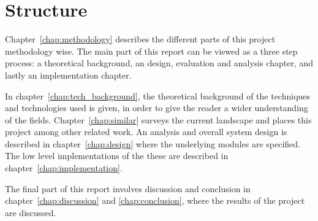 \section{Structure}
  \label{sec:structure}

Chapter~\ref{chap:methodology} describes the different parts of this project methodology wise. The main part of this report can be viewed as a three step process: a theoretical background, an design, evaluation and analysis chapter, and lastly an implementation chapter.

In chapter~\ref{chap:tech_background}, the theoretical background of the techniques and technologies used is given, in order to give the reader a wider understanding of the fields. Chapter~\ref{chap:similar} surveys the current landscape and places this project among other related work. An analysis and overall system design is described in chapter~\ref{chap:design} where the underlying modules are specified. The low level implementations of the these are described in chapter~\ref{chap:implementation}.

The final part of this report involves discussion and conclusion in chapter~\ref{chap:discussion} and \ref{chap:conclusion}, where the results of the project are discussed.
